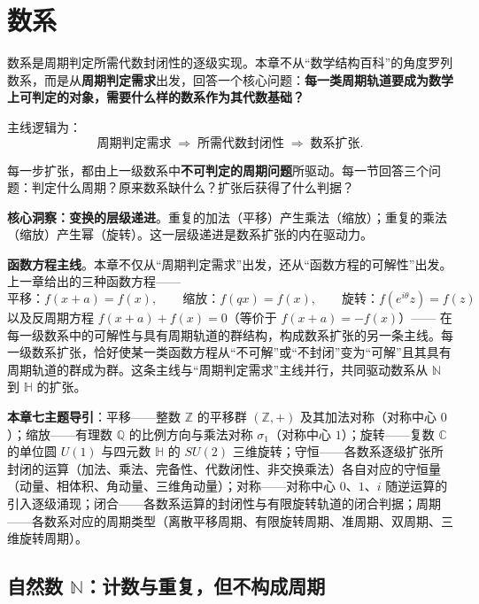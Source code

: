 \chapter{数系}

\begin{remark}[本章定位]\label{rem:chapter_positioning_ch2}
数系是周期判定所需代数封闭性的逐级实现。本章不从“数学结构百科”的角度罗列数系，而是从\textbf{周期判定需求}出发，回答一个核心问题：\textbf{每一类周期轨道要成为数学上可判定的对象，需要什么样的数系作为其代数基础？}

主线逻辑为：
\[
\text{周期判定需求} \;\Longrightarrow\; \text{所需代数封闭性} \;\Longrightarrow\; \text{数系扩张}.
\]

每一步扩张，都由上一级数系中\textbf{不可判定的周期问题}所驱动。每一节回答三个问题：判定什么周期？原来数系缺什么？扩张后获得了什么判据？

\textbf{核心洞察：变换的层级递进}。重复的加法（平移）产生乘法（缩放）；重复的乘法（缩放）产生幂（旋转）。这一层级递进是数系扩张的内在驱动力。

\textbf{函数方程主线}。本章不仅从“周期判定需求”出发，还从“函数方程的可解性”出发。上一章给出的三种函数方程——
\[
\text{平移：} f(x+a)=f(x),\qquad
\text{缩放：} f(qx)=f(x),\qquad
\text{旋转：} f(e^{i\theta}z)=f(z)
\]
以及反周期方程 $f(x+a)+f(x)=0$（等价于 $f(x+a)=-f(x)$）——
在每一级数系中的可解性与具有周期轨道的群结构，构成数系扩张的另一条主线。每一级数系扩张，恰好使某一类函数方程从“不可解”或“不封闭”变为“可解”且其具有周期轨道的群成为群。这条主线与“周期判定需求”主线并行，共同驱动数系从 $\mathbb N$ 到 $\mathbb H$ 的扩张。

\textbf{本章七主题导引}：平移——整数 $\mathbb{Z}$ 的平移群 $(\mathbb{Z},+)$ 及其加法对称（对称中心 $0$）；缩放——有理数 $\mathbb{Q}$ 的比例方向与乘法对称 $\sigma_1$（对称中心 $1$）；旋转——复数 $\mathbb{C}$ 的单位圆 $U(1)$ 与四元数 $\mathbb{H}$ 的 $SU(2)$ 三维旋转；守恒——各数系逐级扩张所封闭的运算（加法、乘法、完备性、代数闭性、非交换乘法）各自对应的守恒量（动量、相体积、角动量、三维角动量）；对称——对称中心 $0$、$1$、$i$ 随逆运算的引入逐级涌现；闭合——各数系运算的封闭性与有限旋转轨道的闭合判据；周期——各数系对应的周期类型（离散平移周期、有限旋转周期、准周期、双周期、三维旋转周期）。
\end{remark}

\section{\texorpdfstring{自然数 $\mathbb{N}$：计数与重复，但不构成周期}{自然数 N：计数与重复，但不构成周期}}

